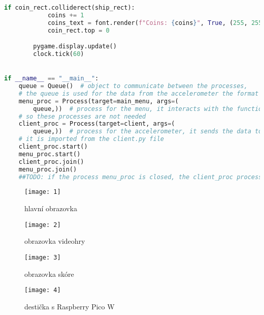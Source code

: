 \documentclass[12pt]{report}			%
\begin{document}
\begin{appendices}
\begin{lstlisting}[title={Program hra.py}, caption={hra.py},  label={lst:hra}, language=Python]
        if coin_rect.colliderect(ship_rect):
            coins += 1
            coins_text = font.render(f"Coins: {coins}", True, (255, 255, 255))
            coin_rect.top = 0

        pygame.display.update()
        clock.tick(60)


if __name__ == "__main__":
    queue = Queue()  # object to communicate between the processes,
    # the queue is used for the data from the accelerometer the format is [x, y, z]
    menu_proc = Process(target=main_menu, args=(
        queue,))  # process for the menu, it interacts with the functions App() and Score(),
    # so these processes are not needed
    client_proc = Process(target=client, args=(
        queue,))  # process for the accelerometer, it sends the data to the queue,
    # it is imported from the client.py file
    client_proc.start()
    menu_proc.start()
    client_proc.join()
    menu_proc.join()
    ##TODO: if the process menu_proc is closed, the client_proc processes should be closed too

\end{lstlisting}
\begin{figure}[h]
\caption{hlavní obrazovka}
\centering
\texttt{[image: 1]}
\end{figure}

\begin{figure}[h]
\caption{obrazovka videohry}
\centering
\texttt{[image: 2]}
\end{figure}

\begin{figure}[h]
\caption{obrazovka skóre}
\centering
\texttt{[image: 3]}
\end{figure}

\begin{figure}[h]
\caption{destička s Raspberry Pico W}
\centering
\texttt{[image: 4]}
\end{figure}

	\end{appendices}
\end{document}
